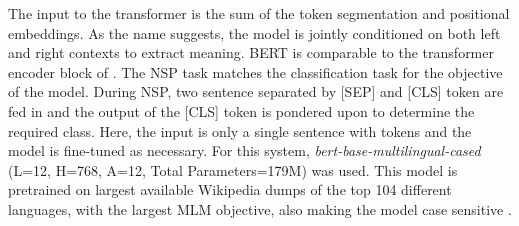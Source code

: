 \documentclass[11pt,a4paper]{article}
\begin{document}
The input to the transformer is the sum of the token segmentation and positional embeddings. As the name suggests, the model is jointly conditioned on both left and right contexts to extract meaning. BERT is comparable to the transformer encoder block of \cite{NIPS2017_3f5ee243}. The NSP task matches the classification task for the objective of the model. During NSP, two sentence separated by [SEP] and [CLS] token are fed in and the output of the [CLS] token is pondered upon to determine the required class. Here, the input is only a single sentence with tokens and the model is fine-tuned as necessary. For this system,  \textit{bert-base-multilingual-cased} (L=12, H=768, A=12, Total Parameters=179M) was used. This model is pretrained on largest available Wikipedia dumps of the top 104 different languages, with the largest MLM objective, also making the model case sensitive \cite{pires-etal-2019-multilingual}.
\end{document}
